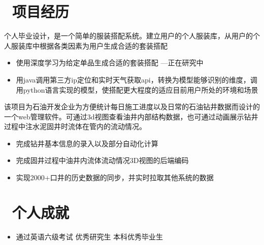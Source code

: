 \documentclass{resume}
\begin{document}
\section{\faUsers\ 项目经历}
\begin{onehalfspacing}
个人毕业设计，是一个简单的服装搭配系统。建立用户的个人服装库，从用户的个人服装库中根据各类因素为用户生成合适的套装搭配
\begin{itemize}
  \item 使用深度学习为给定单品生成合适的套装搭配  ---正在研究中
  \item 用java调用第三方ip定位和实时天气获取api，转换为模型能够识别的维度，调用python语言实现的模型，使搭配更大程度的适应目前用户所处的环境和场景
\end{itemize}
\end{onehalfspacing}

\begin{onehalfspacing}
    该项目为石油开发企业为方便统计每日施工进度以及日常的石油钻井数据而设计的一个web管理软件。可通过3d视图查看油井内部结构数据，也可通过动画展示钻井过程中注水泥固井时流体在管内的流动情况。
\begin{itemize}
  \item 完成钻井基本信息的录入以及部分自动化计算
  \item 完成固井过程中油井内流体流动情况3D视图的后端编码
  \item 实现2000+口井的历史数据的同步，并实时拉取其他系统的数据
\end{itemize}
\end{onehalfspacing}

\section{\faHeartO\ 个人成就}
\begin{itemize}[parsep=0.5ex]
  \item 通过英语六级考试  优秀研究生  本科优秀毕业生
\end{itemize}


%
%
\end{document}
